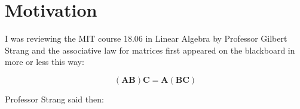\documentclass[10pt,twocolumn]{article}
\begin{document}





\setlength{\parindent}{0cm}


\setlength{\parskip}{1em}
\renewcommand{\baselinestretch}{1.0}

\section*{Motivation}\label{chap:motivation}

I was reviewing the MIT course 18.06 in Linear Algebra by Professor Gilbert Strang and the associative law for matrices first appeared on the blackboard in more or less this way:

\begin{equation} \label{eq:proof}
(\bm{A} \bm{B}) \bm{C} = \bm{A} (\bm{B} \bm{C}) 
\end{equation}


Professor Strang said then:
\end{document}
